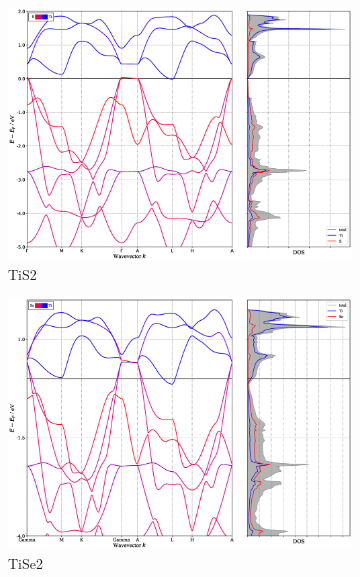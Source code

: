\clearpage
\begin{figure}[H]
\centering
	\begin{subfigure}[b]{.9\textwidth}
    	\includegraphics[width=\linewidth]{img/results/TiS2_GGA_relaxed_BAND+DOS.eps}
    	\caption{TiS2}
	\end{subfigure}
	\begin{subfigure}[b]{.4\textwidth}
    	\includegraphics[width=\linewidth]{img/results/TiSe2_GGA_relaxed_BAND+DOS.eps}
    	\caption{
    	TiSe2}
	\end{subfigure}
	\begin{subfigure}[b]{.4\textwidth}

\end{subfigure}
\end{figure}
